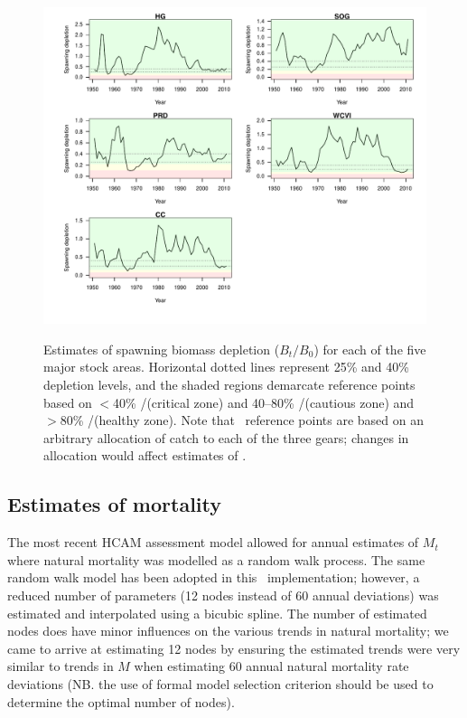 \begin{figure}[!tbp]
	\includegraphics[width=\textwidth]{../FIGS/qPriorFigs/iscam_fig_depletion.pdf}\\
	\caption{Estimates of spawning biomass depletion ($B_t/B_0$) for each of the five major stock areas.  Horizontal dotted lines represent 25\% and 40\% depletion levels, and the shaded regions demarcate reference points based on $<$40\% \bmsy/\bo (critical zone) and 40--80\% \bmsy/\bo(cautious zone) and $>$80\% \bmsy/\bo (healthy zone). Note that \bmsy\ reference points are based on an arbitrary allocation of catch to each of the three gears; changes in allocation would affect estimates of \bmsy.}\label{PartII:Results:figDepletion}
\end{figure}




\subsection{Estimates of mortality}

The most recent HCAM assessment model allowed for annual estimates of $M_t$ where natural mortality was modelled as a random walk process.  The same random walk model has been adopted in this \iscam\ implementation; however, a reduced number of parameters (12 nodes instead of 60 annual deviations) was estimated and interpolated using a bicubic spline.  The number of estimated nodes does have minor influences on the various trends in natural mortality; we came to arrive at estimating 12 nodes by ensuring the estimated trends were very similar to trends in $M$ when estimating 60 annual natural mortality rate deviations (NB. the use of formal model selection criterion should be used to determine the optimal number of nodes).

